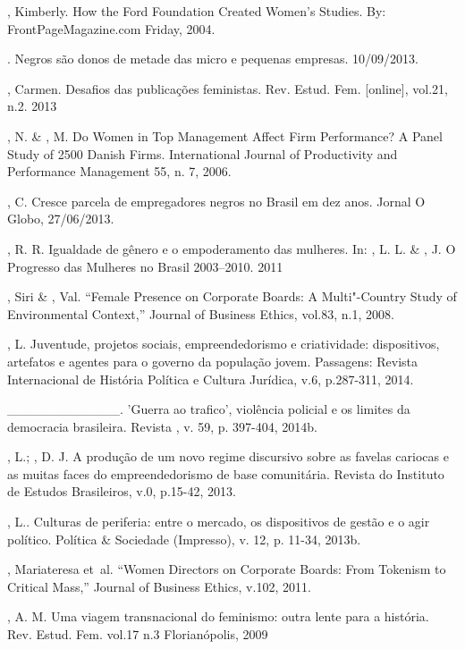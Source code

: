 \begin{Parskip}
, Kimberly. How the Ford Foundation Created Women's Studies. By:
FrontPageMagazine.com \textbar{} Friday, 2004.

. Negros são donos de metade das micro e pequenas empresas.
10/09/2013.

, Carmen. Desafios das publicações feministas. Rev. Estud. Fem.
{[}online{]}, vol.21, n.2. 2013

, N. \& , M. Do Women in Top Management Affect Firm
Performance? A Panel Study of 2500 Danish Firms. International Journal
of Productivity and Performance Management 55, n. 7, 2006.

, C. Cresce parcela de empregadores negros no Brasil em dez anos.
Jornal O Globo, 27/06/2013.

, R. R. Igualdade de gênero e o empoderamento das mulheres. In:
, L. L. \& , J. O Progresso das Mulheres no Brasil
2003--2010. 2011

, Siri \& , Val. ``Female Presence on Corporate Boards: A
Multi"-Country Study of Environmental Context,'' Journal of Business
Ethics, vol.83, n.1, 2008.

, L. Juventude, projetos sociais, empreendedorismo e
criatividade: dispositivos, artefatos e agentes para o governo da
população jovem. Passagens: Revista Internacional de História Política e
Cultura Jurídica, v.6, p.287-311, 2014.

\_\_\_\_\_\_\_\_\_\_\_\_. 'Guerra ao trafico', violência policial e os
limites da democracia brasileira. Revista , v. 59, p. 397-404, 2014b.

, L.; , D. J. A produção de um novo regime discursivo
sobre as favelas cariocas e as muitas faces do empreendedorismo de base
comunitária. Revista do Instituto de Estudos Brasileiros, v.0, p.15-42,
2013.

, L.. Culturas de periferia: entre o mercado, os dispositivos de
gestão e o agir político. Política \& Sociedade (Impresso), v. 12, p.
11-34, 2013b.

, Mariateresa et~al. ``Women Directors on Corporate Boards: From
Tokenism to Critical Mass,'' Journal of Business Ethics, v.102, 2011.

, A. M. Uma viagem transnacional do feminismo: outra lente para a
história. Rev. Estud. Fem. vol.17 n.3 Florianópolis, 2009


\end{Parskip}
